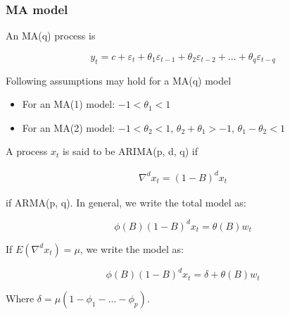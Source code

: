 \documentclass[
  12pt,
]{article}
\providecommand{\tightlist}{%
  \setlength{\itemsep}{0pt}\setlength{\parskip}{0pt}}
\begin{document}
\hypertarget{ma-model}{%
\subsubsection{MA model}\label{ma-model}}

An MA(q) process is

\begin{equation}
\label{eqn:ma-process}
y_t = c + \varepsilon_t + \theta_1 \varepsilon_{t-1} + \theta_2 \varepsilon_{t-2} + ... + \theta_q \varepsilon_{t-q}
\end{equation}

Following assumptions may hold for a MA(q) model

\begin{itemize}
\tightlist
\item
  For an MA(1) model: \(-1 < \theta_1 < 1\)
\item
  For an MA(2) model: \(-1 < \theta_2 < 1\), \(\theta_2 + \theta_1 > -1\), \(\theta_1 - \theta_2 < 1\)
\end{itemize}

A process \(x_t\) is said to be ARIMA(p, d, q) if

\begin{equation}
\label{eqn:arima}
\begin{aligned}
  \nabla^d x_t = ( 1- B)^d x_t
\end{aligned}
\end{equation}

if ARMA(p, q). In general, we write the total model as:

\begin{equation}
\label{eqn:arima-total}
\phi (B)(1-B)^d x_t = \theta (B)w_t
\end{equation}

If \(E (\nabla^d x_t) = \mu\), we write the model as:

\begin{equation}
\label{eqn:arima-full}
\phi(B)(1-B)^d x_t = \delta + \theta (B) w_t
\end{equation}

Where \(\delta = \mu (1-\phi_1 - ... - \phi_p )\).
\end{document}
